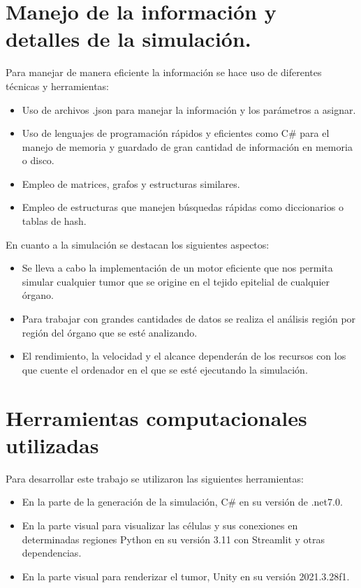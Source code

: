 \section{Manejo de la informaci\'on y detalles de la simulaci\'on.}
Para manejar de manera eficiente la informaci\'on se hace uso de diferentes t\'ecnicas y herramientas:
\begin{itemize}
    \item Uso de archivos .json para manejar la información y los parámetros a asignar.%
    \item Uso de lenguajes de programación rápidos y eficientes como C\# para el manejo de memoria y guardado de gran cantidad de información en memoria o disco.
    \item Empleo de matrices, grafos y estructuras similares.
    \item Empleo de estructuras que manejen búsquedas rápidas como diccionarios o tablas de hash.
\end{itemize}

En cuanto a la simulaci\'on se destacan los siguientes aspectos:
\begin{itemize}
    \item Se lleva a cabo la implementación de un motor eficiente que nos permita simular cualquier tumor que se origine en el tejido epitelial de cualquier órgano.
    \item Para trabajar con grandes cantidades de datos se realiza el análisis región por región del órgano que se esté analizando.
    \item El rendimiento, la velocidad y el alcance dependerán de los recursos con los que cuente el ordenador en el que se esté ejecutando la simulación.
\end{itemize}

\section{Herramientas computacionales utilizadas}

Para desarrollar este trabajo se utilizaron las siguientes herramientas:
\begin{itemize}
    \item En la parte de la generaci\'on de la simulaci\'on, C\# en su versi\'on de .net7.0.
    \item En la parte visual para visualizar las c\'elulas y sus conexiones en determinadas regiones Python en su versi\'on 3.11 con Streamlit y otras dependencias.
    \item En la parte visual para renderizar el tumor, Unity en su versi\'on 2021.3.28f1.
\end{itemize}